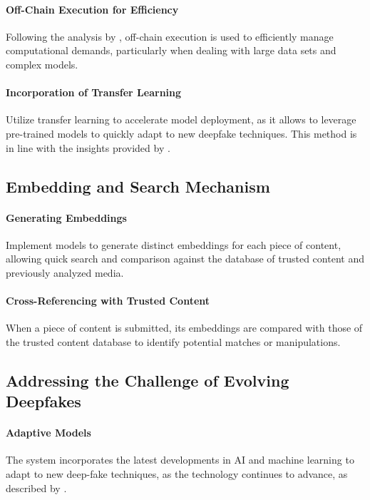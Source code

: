 \documentclass{article}
\begin{document}
\paragraph{Off-Chain Execution for Efficiency} Following the analysis by \citep{sariboz2021offchain}, off-chain execution is used to efficiently manage computational demands, particularly when dealing with large data sets and complex models.

\paragraph{Incorporation of Transfer Learning} Utilize transfer learning to accelerate model deployment, as it allows to leverage pre-trained models to quickly adapt to new deepfake techniques. This method is in line with the insights provided by \citep{ijgi10030137}.

\subsection{Embedding and Search Mechanism}

\paragraph{Generating Embeddings} Implement models to generate distinct embeddings for each piece of content, allowing quick search and comparison against the database of trusted content and previously analyzed media.

\paragraph{Cross-Referencing with Trusted Content} When a piece of content is submitted, its embeddings are compared with those of the trusted content database to identify potential matches or manipulations.

\subsection{Addressing the Challenge of Evolving Deepfakes}

\paragraph{Adaptive Models} The system incorporates the latest developments in AI and machine learning to adapt to new deep-fake techniques, as the technology continues to advance, as described by \citep{castillo2021comprehensive}.
\end{document}
